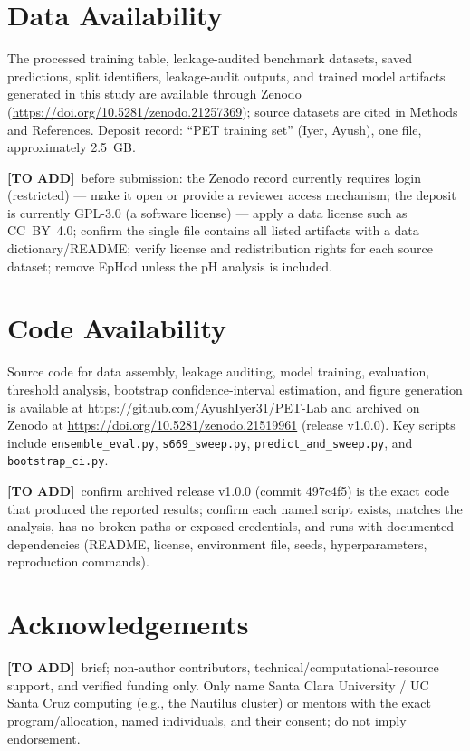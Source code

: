 \documentclass[11pt]{article}
\newcommand{\fillerblock}[1]{%
  \par\smallskip\noindent
  \colorbox{filleryellow}{\parbox{\dimexpr\linewidth-2\fboxsep\relax}{%
    \small\textbf{[TO ADD]}\ #1}}\par\smallskip}
\begin{document}
\section*{Data Availability}
The processed training table, leakage-audited benchmark datasets, saved predictions, split
identifiers, leakage-audit outputs, and trained model artifacts generated in this study are
available through Zenodo (\url{https://doi.org/10.5281/zenodo.21257369}); source datasets are
cited in Methods and References. Deposit record: ``PET training set'' (Iyer, Ayush), one file,
approximately 2.5~GB.
\fillerblock{before submission: the Zenodo record currently requires login (restricted) --- make it open or provide a reviewer access mechanism; the deposit is currently GPL-3.0 (a software license) --- apply a data license such as CC~BY~4.0; confirm the single file contains all listed artifacts with a data dictionary/README; verify license and redistribution rights for each source dataset; remove EpHod unless the pH analysis is included.}

\section*{Code Availability}
Source code for data assembly, leakage auditing, model training, evaluation, threshold analysis,
bootstrap confidence-interval estimation, and figure generation is available at
\url{https://github.com/AyushIyer31/PET-Lab} and archived on Zenodo at
\url{https://doi.org/10.5281/zenodo.21519961} (release v1.0.0). Key scripts include
\texttt{ensemble\_eval.py}, \texttt{s669\_sweep.py}, \texttt{predict\_and\_sweep.py}, and
\texttt{bootstrap\_ci.py}.
\fillerblock{confirm archived release v1.0.0 (commit 497c4f5) is the exact code that produced the reported results; confirm each named script exists, matches the analysis, has no broken paths or exposed credentials, and runs with documented dependencies (README, license, environment file, seeds, hyperparameters, reproduction commands).}

\section*{Acknowledgements}
\fillerblock{brief; non-author contributors, technical/computational-resource support, and verified funding only. Only name Santa Clara University / UC Santa Cruz computing (e.g., the Nautilus cluster) or mentors with the exact program/allocation, named individuals, and their consent; do not imply endorsement.}
\end{document}
